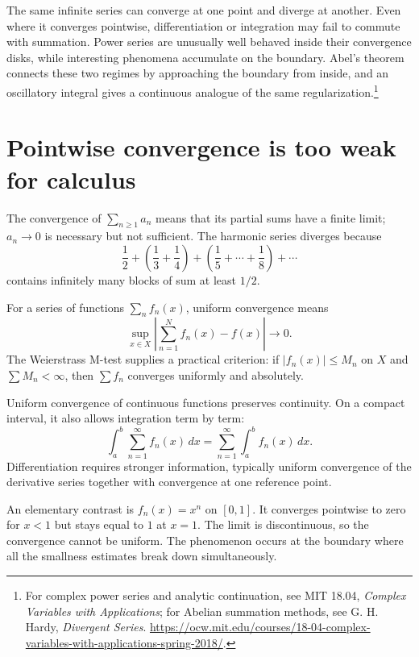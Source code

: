 
The same infinite series can converge at one point and diverge at another. Even where it converges pointwise, differentiation or integration may fail to commute with summation. Power series are unusually well behaved inside their convergence disks, while interesting phenomena accumulate on the boundary. Abel's theorem connects these two regimes by approaching the boundary from inside, and an oscillatory integral gives a continuous analogue of the same regularization.\footnote{For complex power series and analytic continuation, see MIT 18.04, \emph{Complex Variables with Applications}; for Abelian summation methods, see G. H. Hardy, \emph{Divergent Series}. \url{https://ocw.mit.edu/courses/18-04-complex-variables-with-applications-spring-2018/}.}

\section{Pointwise convergence is too weak for calculus}

The convergence of \(\sum_{n\ge1}a_n\) means that its partial sums have a finite limit; \(a_n\to0\) is necessary but not sufficient. The harmonic series diverges because
\[
 \frac12+\left(\frac13+\frac14\right)
 +\left(\frac15+\cdots+\frac18\right)+\cdots
\]
contains infinitely many blocks of sum at least \(1/2\).

For a series of functions \(\sum_n f_n(x)\), uniform convergence means
\[
 \sup_{x\in X}\left|\sum_{n=1}^N f_n(x)-f(x)\right|\longrightarrow0.
\]
The Weierstrass M-test supplies a practical criterion: if \(|f_n(x)|\le M_n\) on \(X\) and \(\sum M_n<\infty\), then \(\sum f_n\) converges uniformly and absolutely.

Uniform convergence of continuous functions preserves continuity. On a compact interval, it also allows integration term by term:
\[
 \int_a^b\sum_{n=1}^{\infty}f_n(x)\,dx
 =\sum_{n=1}^{\infty}\int_a^bf_n(x)\,dx.
\]
Differentiation requires stronger information, typically uniform convergence of the derivative series together with convergence at one reference point.

An elementary contrast is \(f_n(x)=x^n\) on \([0,1]\). It converges pointwise to zero for \(x<1\) but stays equal to \(1\) at \(x=1\). The limit is discontinuous, so the convergence cannot be uniform. The phenomenon occurs at the boundary where all the smallness estimates break down simultaneously.

